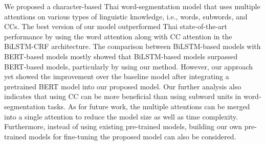 We proposed a character-based Thai word-segmentation model that uses multiple attentions on various types of linguistic knowledge, i.e., words, subwords, and CCs.
%
The best version of our model outperformed Thai state-of-the-art performance by using the word attention along with CC attention in the BiLSTM-CRF architecture.
%
The comparison between BiLSTM-based models with BERT-based models mostly showed that BiLSTM-based models surpassed BERT-based models, particularly by using our method.
%
However, our approach yet showed the improvement over the baseline model after integrating a pretrained BERT model into our proposed model.
%
Our further analysis also indicates that using CC can be more beneficial than using subword units in word-segmentation tasks.
%
As for future work, the multiple attentions can be merged into a single attention to reduce the model size as well as time complexity.
%
Furthermore, instead of using existing pre-trained models, building our own pre-trained models for fine-tuning the proposed model can also be considered.